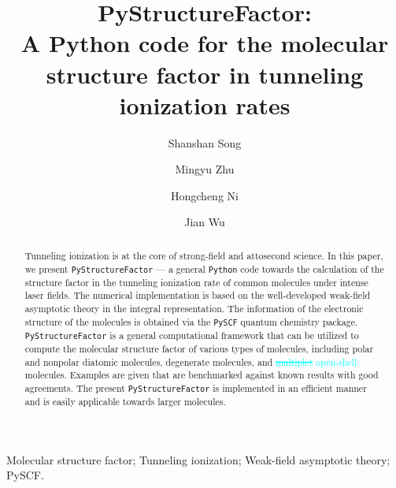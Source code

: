 \documentclass[preprint,12pt]{elsarticle} %
\newcommand{\cyan}[1]{\textcolor{cyan}{#1}}     %
\newcommand{\cout}[1]{\textcolor{cyan}{\sout{#1}}}
\begin{document}
\begin{frontmatter}

\title{PyStructureFactor:\texorpdfstring{\\}{ }A Python code for the molecular structure factor in tunneling ionization rates}

\author[a]{Shanshan Song}
\author[a,b]{Mingyu Zhu}
\author[a,c,d]{Hongcheng Ni}
\author[a,c,d,e]{Jian Wu}

\address[a]{State Key Laboratory of Precision Spectroscopy, East China Normal University, Shanghai 200241, China}
\address[b]{School of Physics and Electronic Science, East China Normal University, Shanghai 200241, China}
\address[c]{NYU-ECNU Joint Institute of Physics, New York University at Shanghai, Shanghai 200062, China}
\address[d]{Collaborative Innovation Center of Extreme Optics, Shanxi University, Taiyuan, Shanxi 030006, China}
\address[e]{CAS Center for Excellence in Ultra-intense Laser Science, Shanghai 201800, China}


\begin{abstract}
Tunneling ionization is at the core of strong-field and attosecond science. In this paper, we present \texttt{PyStructureFactor} --- a general \texttt{Python} code towards the calculation of the structure factor in the tunneling ionization rate of common molecules under intense laser fields. The numerical implementation is based on the well-developed weak-field asymptotic theory in the integral representation. The information of the electronic structure of the molecules is obtained via the \texttt{PySCF} quantum chemistry package. \texttt{PyStructureFactor} is a general computational framework that can be utilized to compute the molecular structure factor of various types of molecules, including polar and nonpolar diatomic molecules, degenerate molecules, and \cout{multiplet} \cyan{open-shell} molecules. Examples are given that are benchmarked against known results with good agreements. The present \texttt{PyStructureFactor} is implemented in an efficient manner and is easily applicable towards larger molecules.
\end{abstract}

\begin{keyword}
Molecular structure factor; Tunneling ionization; Weak-field asymptotic theory; PySCF.
\end{keyword}

\end{frontmatter}
\end{document}

